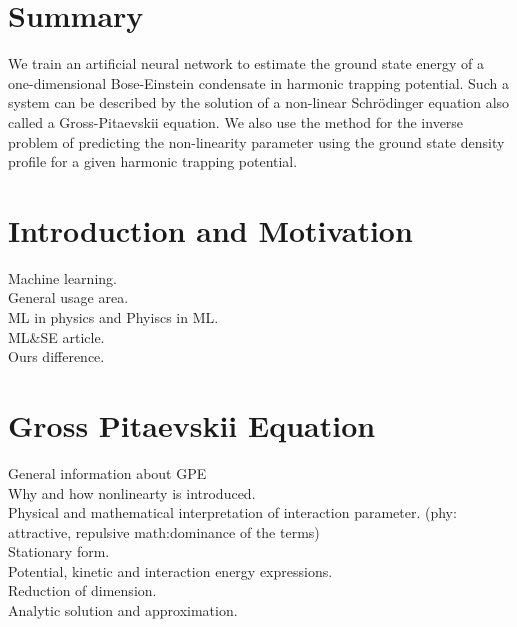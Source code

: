 \documentclass[a4paper,times,12pt]{article}
\begin{document}
\setcounter{page}{1}

\section*{Summary}

We train an artificial neural network to estimate the ground state energy
of a one-dimensional Bose-Einstein condensate in harmonic trapping potential.
Such a system can be described by the solution of a non-linear Schr{\"o}dinger equation also called a Gross-Pitaevskii equation. We also use the method for the inverse problem of predicting the non-linearity parameter using the ground
state density profile for a given harmonic trapping potential.

\newpage
\tableofcontents

\newpage

\section{Introduction and Motivation}
\label{sec:Intro}
\noindent 
Machine learning.\\
General usage area.\\
ML in physics and Phyiscs in ML.\\
ML\&SE article.\\
Ours difference.\\


\section{Gross Pitaevskii Equation}
\noindent   
General information about GPE \\
Why and how nonlinearty is introduced.\\
Physical and mathematical interpretation of interaction parameter. (phy: attractive, repulsive  math:dominance of the terms)\\
Stationary form.\\
Potential, kinetic and interaction energy expressions.\\
Reduction of dimension.\\
Analytic solution and approximation.
\end{document}
